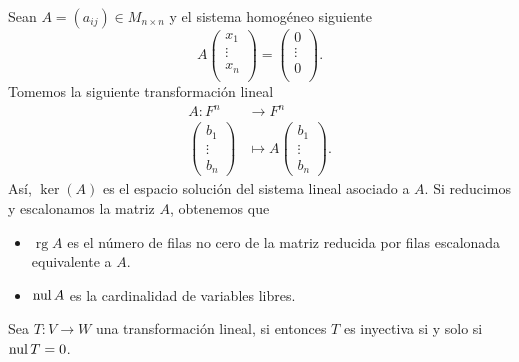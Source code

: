 \documentclass[12pt,a4paper]{book}
\DeclareMathOperator{\rg}{rg}
\begin{document}
    \begin{ejemplo}
        Sean $A = (a_{ij}) \in M_{n \times n}$ y el sistema homogéneo siguiente
        \begin{equation*}
        A
        \begin{pmatrix}
        x_1 \\
        \vdots \\
        x_n \\
        \end{pmatrix}
        = 
        \begin{pmatrix}
        0\\
        \vdots\\
        0\\
        \end{pmatrix}.
        \end{equation*}
        Tomemos la siguiente transformación lineal
        \begin{align*}
            A:F^n & \to F^n\\
            \begin{pmatrix}
                b_1\\
                \vdots\\
                b_n
            \end{pmatrix}
            & \mapsto A
            \begin{pmatrix}
                b_1\\
                \vdots\\
                b_n
            \end{pmatrix}.
        \end{align*}
        Así, $\ker(A)$ es el espacio solución del sistema lineal asociado a $A$. Si reducimos y escalonamos la matriz $A$, obtenemos que
        \begin{itemize}
            \item $\rg{A}$ es el número de filas no cero de la matriz reducida por filas escalonada equivalente a $A$.
            \item $\operatorname{nul}{A}$ es la cardinalidad de variables libres.
        \end{itemize}
    \end{ejemplo}

    \begin{proposicion}
        Sea $T:V \to W$ una transformación lineal, si entonces $T$ es inyectiva si y solo si $\operatorname{nul}{T} = 0$.
    \end{proposicion}
\end{document}
